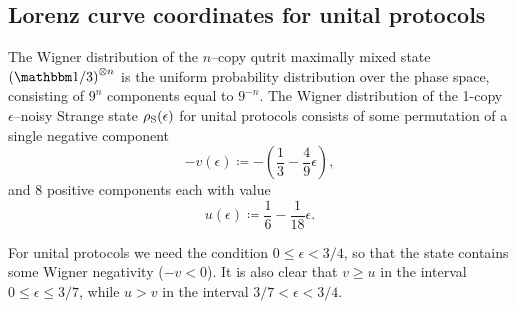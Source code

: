 \documentclass[pra,
aps,
twocolumn,
superscriptaddress,
groupedaddress,
nofootinbib,
reprint
]{revtex4-1}
\begin{document}
\subsection{Lorenz curve coordinates for unital protocols}\label{app:lcsu_coord}

The Wigner distribution of the $n$--copy qutrit maximally mixed state $\left(\id/3\right)^{\otimes n}$ is the uniform probability distribution over the phase space, consisting of $9^n$ components equal to $9^{-n}$.
The Wigner distribution of the 1-copy $\epsilon$--noisy Strange state $\rho_{\rm{S}}(\epsilon)$ for unital protocols consists of some permutation of a single negative component
\begin{equation}
	- v(\epsilon) \coloneqq - \left( \frac{1}{3} -\frac{4}{9}\epsilon \right),
\end{equation} 
and $8$ positive components each with value
\begin{equation}
	u(\epsilon) \coloneqq \frac{1}{6} -\frac{1}{18}\epsilon.
\end{equation}

For unital protocols we need the condition $0 \leq \epsilon < 3/4$, so that the state contains some Wigner negativity ($-v < 0$).
It is also clear that $v \geq u$ in the interval $0 \leq \epsilon \leq 3/7$, while $u > v$ in the interval $3/7 < \epsilon < 3/4$.
\end{document}
